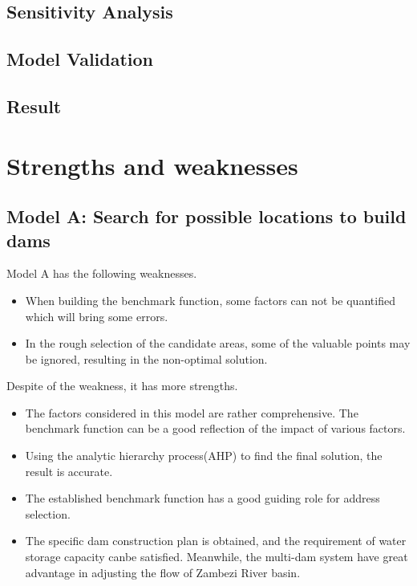 \documentclass{mcmthesis}
\begin{document}

\subsection{Sensitivity Analysis}

\subsection{Model Validation}

\subsection{Result}

\section{Strengths and weaknesses}
\subsection{Model A: Search for possible locations to build dams}
Model A has the following weaknesses.
\begin{itemize}
\item When building the benchmark function, some factors can not be quantified which will bring some errors.
\item In the rough selection of the candidate areas, some of the valuable points may be ignored, resulting in the non-optimal solution.
\end{itemize}
Despite of the weakness, it has more strengths.
\begin{itemize}
  \item The factors considered in this model are rather comprehensive. The benchmark function can be a good reflection of the impact of various factors.
  \item Using the analytic hierarchy process(AHP) to find the final solution, the result is accurate.
  \item The established benchmark function has a good guiding role for address selection.
  \item The specific dam construction plan is obtained, and the requirement of water storage capacity canbe satisfied. Meanwhile, the multi-dam system have great advantage in adjusting the flow of Zambezi River basin.
\end{itemize}
\end{document}
